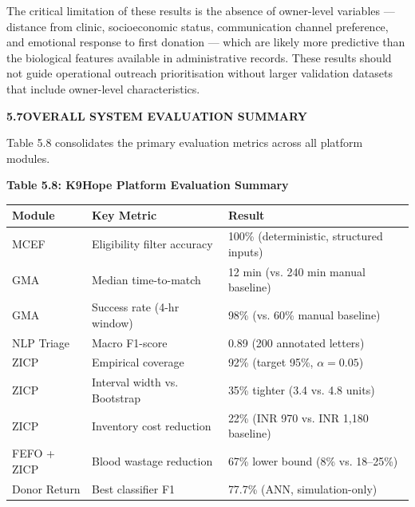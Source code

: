 \documentclass[12pt,a4paper]{article}
\begin{document}
\noindent The critical limitation of these results is the absence of owner-level variables — distance from clinic, socioeconomic status, communication channel preference, and emotional response to first donation — which are likely more predictive than the biological features available in administrative records. These results should not guide operational outreach prioritisation without larger validation datasets that include owner-level characteristics.

\vspace{2em}
\noindent\textbf{5.7\quad OVERALL SYSTEM EVALUATION SUMMARY}
\vspace{0.8em}

\noindent Table 5.8 consolidates the primary evaluation metrics across all platform modules.

\begin{center}
\textbf{Table 5.8: K9Hope Platform Evaluation Summary}
\vspace{0.4em}
\begin{tabular}{p{4cm} p{3.5cm} p{5.5cm}}
\toprule
\textbf{Module} & \textbf{Key Metric} & \textbf{Result} \\
\midrule
MCEF & Eligibility filter accuracy & 100\% (deterministic, structured inputs) \\
GMA & Median time-to-match & 12 min (vs. 240 min manual baseline) \\
GMA & Success rate (4-hr window) & 98\% (vs. 60\% manual baseline) \\
NLP Triage & Macro F1-score & 0.89 (200 annotated letters) \\
ZICP & Empirical coverage & 92\% (target 95\%, $\alpha = 0.05$) \\
ZICP & Interval width vs. Bootstrap & 35\% tighter (3.4 vs. 4.8 units) \\
ZICP & Inventory cost reduction & 22\% (INR 970 vs. INR 1,180 baseline) \\
FEFO + ZICP & Blood wastage reduction & 67\% lower bound (8\% vs. 18--25\%) \\
Donor Return & Best classifier F1 & 77.7\% (ANN, simulation-only) \\
\bottomrule
\end{tabular}
\end{center}
\end{document}

